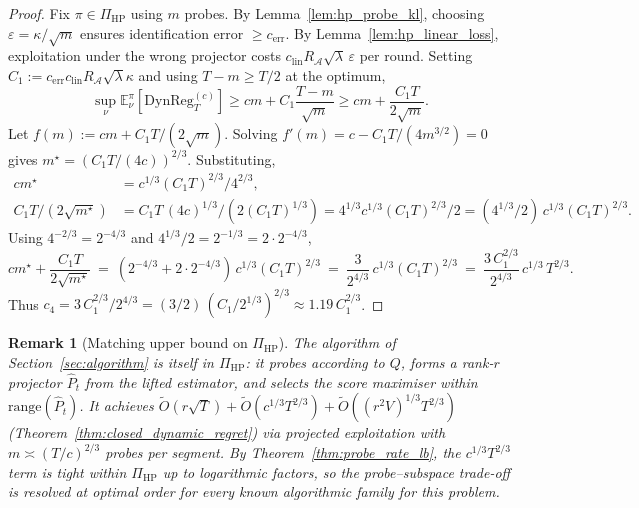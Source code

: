\documentclass[11pt]{article}
\newcommand{\E}{\mathbb{E}}
\newcommand{\cA}{\mathcal{A}}
\newcommand{\DynReg}{\mathrm{DynReg}}
\newcommand{\range}{\mathrm{range}}
\newtheorem{remark}{Remark}
\begin{document}
\begin{proof}
Fix $\pi\in\Pi_{\mathrm{HP}}$ using $m$ probes.
By Lemma~\ref{lem:hp_probe_kl}, choosing $\varepsilon=\kappa/\sqrt{m}$ ensures
identification error $\ge c_{\mathrm{err}}$.
By Lemma~\ref{lem:hp_linear_loss}, exploitation under the wrong projector costs
$c_{\mathrm{lin}}R_{\cA}\sqrt{\lambda}\,\varepsilon$ per round.
Setting $C_1:=c_{\mathrm{err}}c_{\mathrm{lin}}R_{\cA}\sqrt{\lambda}\kappa$ and
using $T-m\ge T/2$ at the optimum,
\[
\sup_\nu\E_\nu^\pi[\DynReg_T^{(c)}]
\ge cm + C_1\frac{T{-}m}{\sqrt{m}}
\ge cm + \frac{C_1T}{2\sqrt{m}}.
\]
Let $f(m):=cm+C_1T/(2\sqrt m)$.  Solving $f'(m)=c-C_1T/(4m^{3/2})=0$ gives
$m^\star=(C_1T/(4c))^{2/3}$.  Substituting,
\begin{align*}
  c m^\star
  &=c^{1/3}(C_1T)^{2/3}/4^{2/3},\\
  C_1T/(2\sqrt{m^\star})
  &=C_1T\,(4c)^{1/3}/(2(C_1T)^{1/3})
  =4^{1/3}c^{1/3}(C_1T)^{2/3}/2
  =(4^{1/3}/2)\,c^{1/3}(C_1T)^{2/3}.
\end{align*}
Using $4^{-2/3}=2^{-4/3}$ and $4^{1/3}/2=2^{-1/3}=2\cdot 2^{-4/3}$,
\[
  cm^\star + \frac{C_1T}{2\sqrt{m^\star}}
  \ =\ (2^{-4/3}+2\cdot 2^{-4/3})\,c^{1/3}(C_1T)^{2/3}
  \ =\ \frac{3}{2^{4/3}}\,c^{1/3}(C_1T)^{2/3}
  \ =\ \frac{3\,C_1^{2/3}}{2^{4/3}}\,c^{1/3}\,T^{2/3}.
\]
Thus $c_4=3\,C_1^{2/3}/2^{4/3}=(3/2)\,(C_1/2^{1/3})^{2/3}\approx 1.19\,C_1^{2/3}$.
\end{proof}

\begin{remark}[Matching upper bound on $\Pi_{\mathrm{HP}}$]
\label{rem:matching_upper_bound}
The algorithm of Section~\ref{sec:algorithm} is itself in
$\Pi_{\mathrm{HP}}$: it probes according to $Q$, forms a rank-$r$
projector $\widehat P_t$ from the lifted estimator, and selects the score
maximiser within $\range(\widehat P_t)$.  It achieves
$\widetilde O(r\sqrt T)+\widetilde O(c^{1/3}T^{2/3})+\widetilde O((r^2V)^{1/3}T^{2/3})$
(Theorem~\ref{thm:closed_dynamic_regret}) via projected exploitation with
$m\asymp(T/c)^{2/3}$ probes per segment.
By Theorem~\ref{thm:probe_rate_lb}, the $c^{1/3}T^{2/3}$ term is tight
within $\Pi_{\mathrm{HP}}$ up to logarithmic factors, so the
probe--subspace trade-off is resolved at optimal order for every known
algorithmic family for this problem.
\end{remark}
\end{document}
